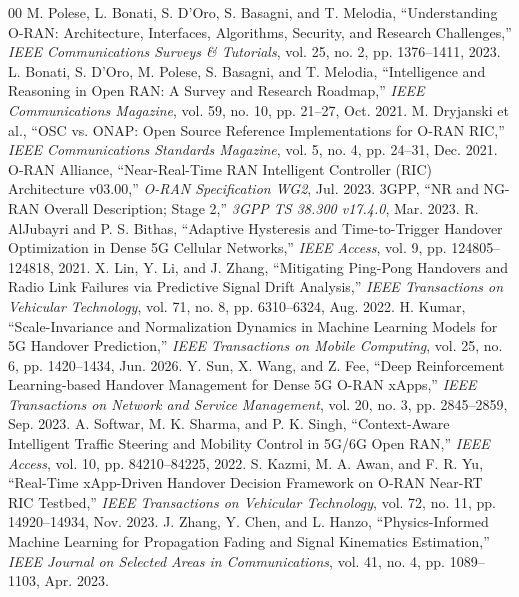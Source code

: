 \documentclass[conference]{IEEEtran}
\begin{document}
\begin{thebibliography}{00}
 M. Polese, L. Bonati, S. D'Oro, S. Basagni, and T. Melodia, ``Understanding O-RAN: Architecture, Interfaces, Algorithms, Security, and Research Challenges,'' \textit{IEEE Communications Surveys \& Tutorials}, vol. 25, no. 2, pp. 1376--1411, 2023.
 L. Bonati, S. D'Oro, M. Polese, S. Basagni, and T. Melodia, ``Intelligence and Reasoning in Open RAN: A Survey and Research Roadmap,'' \textit{IEEE Communications Magazine}, vol. 59, no. 10, pp. 21--27, Oct. 2021.
 M. Dryjanski et al., ``OSC vs. ONAP: Open Source Reference Implementations for O-RAN RIC,'' \textit{IEEE Communications Standards Magazine}, vol. 5, no. 4, pp. 24--31, Dec. 2021.
 O-RAN Alliance, ``Near-Real-Time RAN Intelligent Controller (RIC) Architecture v03.00,'' \textit{O-RAN Specification WG2}, Jul. 2023.
 3GPP, ``NR and NG-RAN Overall Description; Stage 2,'' \textit{3GPP TS 38.300 v17.4.0}, Mar. 2023.
 R. AlJubayri and P. S. Bithas, ``Adaptive Hysteresis and Time-to-Trigger Handover Optimization in Dense 5G Cellular Networks,'' \textit{IEEE Access}, vol. 9, pp. 124805--124818, 2021.
 X. Lin, Y. Li, and J. Zhang, ``Mitigating Ping-Pong Handovers and Radio Link Failures via Predictive Signal Drift Analysis,'' \textit{IEEE Transactions on Vehicular Technology}, vol. 71, no. 8, pp. 6310--6324, Aug. 2022.
 H. Kumar, ``Scale-Invariance and Normalization Dynamics in Machine Learning Models for 5G Handover Prediction,'' \textit{IEEE Transactions on Mobile Computing}, vol. 25, no. 6, pp. 1420--1434, Jun. 2026.
 Y. Sun, X. Wang, and Z. Fee, ``Deep Reinforcement Learning-based Handover Management for Dense 5G O-RAN xApps,'' \textit{IEEE Transactions on Network and Service Management}, vol. 20, no. 3, pp. 2845--2859, Sep. 2023.
 A. Softwar, M. K. Sharma, and P. K. Singh, ``Context-Aware Intelligent Traffic Steering and Mobility Control in 5G/6G Open RAN,'' \textit{IEEE Access}, vol. 10, pp. 84210--84225, 2022.
 S. Kazmi, M. A. Awan, and F. R. Yu, ``Real-Time xApp-Driven Handover Decision Framework on O-RAN Near-RT RIC Testbed,'' \textit{IEEE Transactions on Vehicular Technology}, vol. 72, no. 11, pp. 14920--14934, Nov. 2023.
 J. Zhang, Y. Chen, and L. Hanzo, ``Physics-Informed Machine Learning for Propagation Fading and Signal Kinematics Estimation,'' \textit{IEEE Journal on Selected Areas in Communications}, vol. 41, no. 4, pp. 1089--1103, Apr. 2023.

\end{thebibliography}
\end{document}
